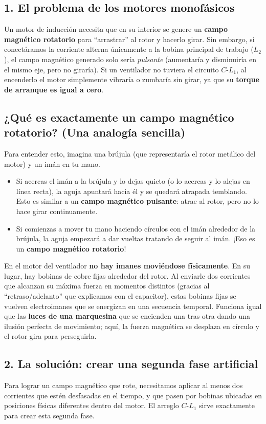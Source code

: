 \documentclass[12pt, a4paper]{article}
\begin{document}
\subsection*{1. El problema de los motores monofásicos}
Un motor de inducción necesita que en su interior se genere un \textbf{campo magnético rotatorio} para ``arrastrar'' al rotor y hacerlo girar. Sin embargo, si conectáramos la corriente alterna únicamente a la bobina principal de trabajo ($L_2$), el campo magnético generado solo sería \textit{pulsante} (aumentaría y disminuiría en el mismo eje, pero no giraría). Si un ventilador no tuviera el circuito $C$-$L_1$, al encenderlo el motor simplemente vibraría o zumbaría sin girar, ya que su \textbf{torque de arranque es igual a cero}.

\subsection*{¿Qué es exactamente un campo magnético rotatorio? (Una analogía sencilla)}
Para entender esto, imagina una brújula (que representaría el rotor metálico del motor) y un imán en tu mano.
\begin{itemize}
    \item Si acercas el imán a la brújula y lo dejas quieto (o lo acercas y lo alejas en línea recta), la aguja apuntará hacia él y se quedará atrapada temblando. Esto es similar a un \textbf{campo magnético pulsante}: atrae al rotor, pero no lo hace girar continuamente.
    \item Si comienzas a mover tu mano haciendo círculos con el imán alrededor de la brújula, la aguja empezará a dar vueltas tratando de seguir al imán. ¡Eso es un \textbf{campo magnético rotatorio}!
\end{itemize}
En el motor del ventilador \textbf{no hay imanes moviéndose físicamente}. En su lugar, hay bobinas de cobre fijas alrededor del rotor. Al enviarle dos corrientes que alcanzan su máxima fuerza en momentos distintos (gracias al ``retraso/adelanto'' que explicamos con el capacitor), estas bobinas fijas se vuelven electroimanes que se energizan en una secuencia temporal. Funciona igual que las \textbf{luces de una marquesina} que se encienden una tras otra dando una ilusión perfecta de movimiento; aquí, la fuerza magnética se desplaza en círculo y el rotor gira para perseguirla.

\subsection*{2. La solución: crear una segunda fase artificial}
Para lograr un campo magnético que rote, necesitamos aplicar al menos dos corrientes que estén desfasadas en el tiempo, y que pasen por bobinas ubicadas en posiciones físicas diferentes dentro del motor. El arreglo $C$-$L_1$ sirve exactamente para crear esta segunda fase.
\end{document}
